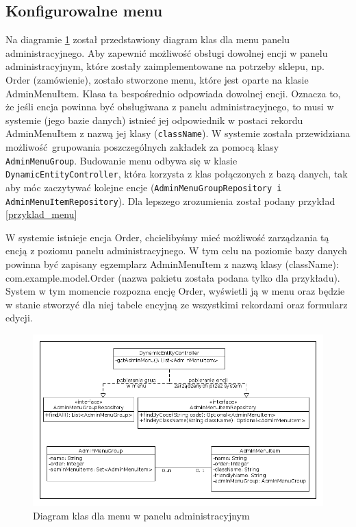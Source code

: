 \subsection{Konfigurowalne menu}
Na diagramie \ref{klasy_menu} został przedstawiony diagram klas dla menu panelu administracyjnego. Aby zapewnić możliwość obsługi dowolnej encji w panelu administracyjnym, które zostały zaimplementowane na potrzeby sklepu, np. Order (zamówienie), zostało stworzone menu, które jest oparte na klasie AdminMenuItem. Klasa ta bespośrednio odpowiada dowolnej encji. Oznacza to, że jeśli encja powinna być obsługiwana z panelu administracyjnego, to musi w systemie (jego bazie danych) istnieć jej odpowiednik w postaci rekordu AdminMenuItem z nazwą jej klasy (\texttt{className}). W systemie została przewidziana możliwość grupowania poszczególnych zakładek za pomocą klasy \texttt{AdminMenuGroup}. Budowanie menu odbywa się w klasie \texttt{DynamicEntityController}, która korzysta z klas połączonych z bazą danych, tak aby móc zaczytywać kolejne encje (\texttt{AdminMenuGroupRepository i AdminMenuItemRepository}). Dla lepszego zrozumienia został podany przykład \ref{przyklad_menu}
\begin{example}
	W systemie istnieje encja Order, chcielibyśmy mieć możliwość zarządzania tą encją z poziomu panelu administracyjnego. W tym celu na poziomie bazy danych powinna być zapisany egzemplarz AdminMenuItem z nazwą klasy (className): com.example.model.Order (nazwa pakietu została podana tylko dla przykładu). System w tym momencie rozpozna encję Order, wyświetli ją w menu oraz będzie w stanie stworzyć dla niej tabele encyjną ze wszystkimi rekordami oraz formularz edycji. 
\end{example} 
\begin{figure}
	\begin{center}
		\includegraphics[scale=0.5]{klasy_menu.png}
	\end{center}
	\caption{{\color{black}Diagram klas dla menu w panelu administracyjnym}} \label{klasy_menu}
\end{figure}

